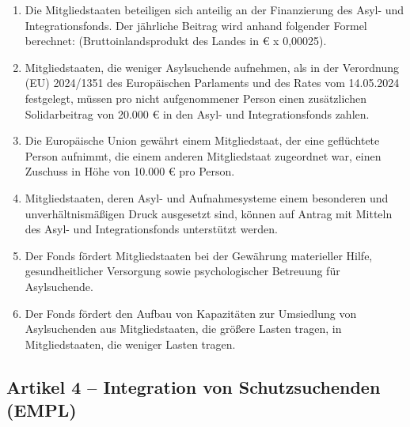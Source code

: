 \documentclass[12pt,a4paper]{article}
\begin{document}
\begin{enumerate}[leftmargin=2em, itemsep=6pt]
  \item Die Mitgliedstaaten beteiligen sich anteilig an der Finanzierung des Asyl- und Integrationsfonds. Der jährliche Beitrag wird anhand folgender Formel berechnet: (Bruttoinlandsprodukt des Landes in \euro{} x 0,00025).
  
  \item Mitgliedstaaten, die weniger Asylsuchende aufnehmen, als in der Verordnung (EU) 2024/1351 des Europäischen Parlaments und des Rates vom 14.05.2024 festgelegt, müssen pro nicht aufgenommener Person einen zusätzlichen Solidarbeitrag von 20.000 \euro{} in den Asyl- und Integrationsfonds zahlen.

  \item Die Europäische Union gewährt einem Mitgliedstaat, der eine geflüchtete Person aufnimmt, die einem anderen Mitgliedstaat zugeordnet war, einen Zuschuss in Höhe von 10.000 \euro{} pro Person.

  \item Mitgliedstaaten, deren Asyl- und Aufnahmesysteme einem besonderen und unverhältnismäßigen Druck ausgesetzt sind, können auf Antrag mit Mitteln des Asyl- und Integrationsfonds unterstützt werden.

  \item Der Fonds fördert Mitgliedstaaten bei der Gewährung materieller Hilfe, gesundheitlicher Versorgung sowie psychologischer Betreuung für Asylsuchende.

  \item Der Fonds fördert den Aufbau von Kapazitäten zur Umsiedlung von Asylsuchenden aus Mitgliedstaaten, die größere Lasten tragen, in Mitgliedstaaten, die weniger Lasten tragen.
\end{enumerate}

\vspace{-0.2cm}

\subsection*{Artikel 4 – Integration von Schutzsuchenden (EMPL)}
\end{document}
